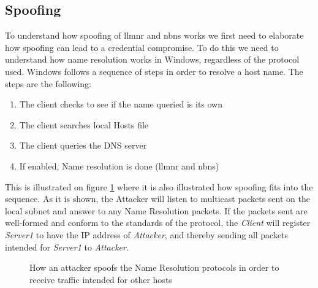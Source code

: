 \documentclass{article}
\begin{document}
\subsection{Spoofing}
\label{sec:spoofing}
To understand how spoofing of \gls{llmnr} and \gls{nbns} works we first need to elaborate how spoofing can lead to a credential compromise. To do this we need to understand how name resolution works in Windows, regardless of the protocol used. Windows follows a sequence of steps in order to resolve a host name.\cite{url:microsoft:name-resolution-order} The steps are the following:
\begin{enumerate}
	\item The client checks to see if the name queried is its own
	\item The client searches local Hosts file
	\item The client queries the DNS server
	\item If enabled, Name resolution is done (\gls{llmnr} and \gls{nbns})
\end{enumerate}

This is illustrated on figure \ref{fig:host-resolution-sequence-and-spoofing} where it is also illustrated how spoofing fits into the sequence. As it is shown, the Attacker will listen to multicast packets sent on the local subnet and answer to any Name Resolution packets. If the packets sent are well-formed and conform to the standards of the protocol, the \emph{Client} will register \emph{Server1} to have the IP address of \emph{Attacker}, and thereby sending all packets intended for \emph{Server1} to \emph{Attacker}.

\begin{figure}[!ht]
	\centering
	\caption{How an attacker spoofs the Name Resolution protocols in order to receive traffic intended for other hosts}
	\label{fig:host-resolution-sequence-and-spoofing}
\end{figure}
\end{document}
